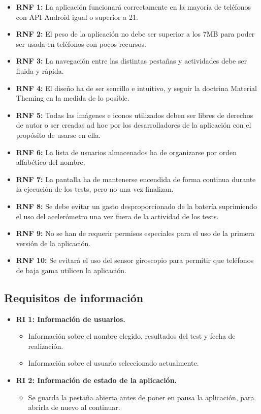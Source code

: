 \begin{itemize}
    \item \textbf{RNF 1:} La aplicación funcionará correctamente en la mayoría de teléfonos con API Android igual o superior a 21.
    \item \textbf{RNF 2:} \label{RNF:2} El peso de la aplicación no debe ser superior a los 7MB para poder ser usada en teléfonos con pocos recursos.
    \item \textbf{RNF 3:} La navegación entre las distintas pestañas y actividades debe ser fluida y rápida.
    \item \textbf{RNF 4:} El diseño ha de ser sencillo e intuitivo, y seguir la doctrina Material Theming en la medida de lo posible.
    \item \textbf{RNF 5:} \label{RNF:5} Todas las imágenes e iconos utilizados deben ser libres de derechos de autor o ser creadas ad hoc por los desarrolladores de la aplicación con el propósito de usarse en ella.
    \item \textbf{RNF 6:} La lista de usuarios almacenados ha de organizarse por orden alfabético del nombre.
    \item \textbf{RNF 7:} La pantalla ha de mantenerse encendida de forma continua durante la ejecución de los tests, pero no una vez finalizan.
    \item \textbf{RNF 8:} Se debe evitar un gasto desproporcionado de la batería suprimiendo el uso del acelerómetro una vez fuera de la actividad de los tests.
    \item \textbf{RNF 9:} No se han de requerir permisos especiales para el uso de la primera versión de la aplicación.
    \item \textbf{RNF 10:} Se evitará el uso del sensor giroscopio para permitir que teléfonos de baja gama utilicen la aplicación.
\end{itemize}

\subsection{Requisitos de información}

\begin{itemize}
    \item \textbf{RI 1: Información de usuarios.}
    \begin{itemize}
        \item Información sobre el nombre elegido, resultados del test y fecha de realización.
        \item Información sobre el usuario seleccionado actualmente.
    \end{itemize}
    
    \item \textbf{RI 2: Información de estado de la aplicación.}
    \begin{itemize}
        \item Se guarda la pestaña abierta antes de poner en pausa la aplicación, para abrirla de nuevo al continuar.
    \end{itemize}
\end{itemize}

